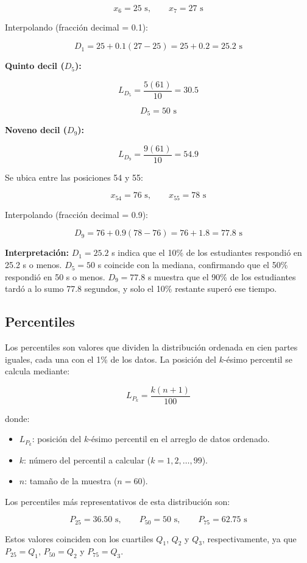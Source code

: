 \documentclass[12pt,letterpaper]{article}
\begin{document}
\[
x_6=25 \text{ s},\qquad x_7=27 \text{ s}
\]

Interpolando (fracción decimal = 0.1):

\[
D_1=25+0.1(27-25)=25+0.2=25.2 \text{ s}
\]

\textbf{Quinto decil ($D_5$):}

\[
L_{D_5}=\frac{5(61)}{10}=30.5
\]

\[
D_5=50 \text{ s}
\]

\textbf{Noveno decil ($D_9$):}

\[
L_{D_9}=\frac{9(61)}{10}=54.9
\]

Se ubica entre las posiciones 54 y 55:

\[
x_{54}=76 \text{ s},\qquad x_{55}=78 \text{ s}
\]

Interpolando (fracción decimal = 0.9):

\[
D_9=76+0.9(78-76)=76+1.8=77.8 \text{ s}
\]

\textbf{Interpretación:} $D_1 = 25.2$ s indica que el 10\% de los estudiantes respondió en 25.2 s o menos. $D_5 = 50$ s coincide con la mediana, confirmando que el 50\% respondió en 50 s o menos. $D_9 = 77.8$ s muestra que el 90\% de los estudiantes tardó a lo sumo 77.8 segundos, y solo el 10\% restante superó ese tiempo.

\subsection{Percentiles}

Los percentiles son valores que dividen la distribución ordenada en cien partes iguales, cada una con el 1\% de los datos. La posición del $k$-ésimo percentil se calcula mediante:

\[
L_{P_k}=\frac{k(n+1)}{100}
\]

donde:
\begin{itemize}[leftmargin=1.2cm]
    \item $L_{P_k}$: posición del $k$-ésimo percentil en el arreglo de datos ordenado.
    \item $k$: número del percentil a calcular ($k = 1, 2, \ldots, 99$).
    \item $n$: tamaño de la muestra ($n = 60$).
\end{itemize}

Los percentiles más representativos de esta distribución son:

\[
P_{25}=36.50 \text{ s},\qquad P_{50}=50 \text{ s},\qquad P_{75}=62.75 \text{ s}
\]

Estos valores coinciden con los cuartiles $Q_1$, $Q_2$ y $Q_3$, respectivamente, ya que $P_{25} = Q_1$, $P_{50} = Q_2$ y $P_{75} = Q_3$.
\end{document}
